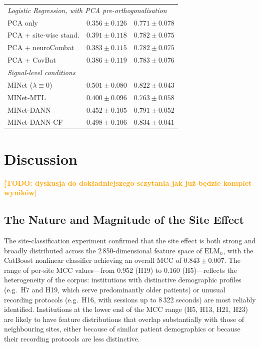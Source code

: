 \documentclass[preprint,12pt]{elsarticle}
\newcommand{\td}[1]{\textcolor{orange}{\textbf{[TODO: #1]}}}
\begin{document}
\begin{table}[htbp]
\begin{tabular}{lcc}
    \midrule
    \multicolumn{3}{l}{\textit{Logistic Regression, with PCA pre-orthogonalisation}} \\
    \quad PCA only
      & $0.356 \pm 0.126$ & $0.771 \pm 0.078$ \\
    \quad PCA + site-wise stand.
      & $0.391 \pm 0.118$ & $0.782 \pm 0.075$ \\
    \quad PCA + neuroCombat
      & $0.383 \pm 0.115$ & $0.782 \pm 0.075$ \\
    \quad PCA + CovBat
      & $0.386 \pm 0.119$ & $0.783 \pm 0.076$ \\
    \midrule
    \multicolumn{3}{l}{\textit{Signal-level conditions}} \\
    \quad MINet ($\lambda \equiv 0$)
      & $0.501 \pm 0.080$ & $0.822 \pm 0.043$ \\
    \quad MINet-MTL
      & $0.400 \pm 0.096$ & $0.763 \pm 0.058$ \\
    \quad MINet-DANN
      & $0.452 \pm 0.105$ & $0.791 \pm 0.052$ \\
    \quad MINet-DANN-CF
      & $0.498 \pm 0.106$ & $0.834 \pm 0.041$ \\
    \bottomrule
  \end{tabular}
\end{table}





\section{Discussion}
\label{sec:discussion}
\td{dyskusja do dokładniejszego sczytania jak już będzie komplet wyników}
\subsection{The Nature and Magnitude of the Site Effect}
\label{subsec:disc_site_effect}

The site-classification experiment confirmed that the site effect is
both strong and broadly distributed across the 2\,850-dimensional
feature space of $\mathrm{ELM}_n$, with the CatBoost nonlinear
classifier achieving an overall MCC of $0.843 \pm 0.007$.
The range of per-site MCC values---from 0.952 (H19) to 0.160
(H5)---reflects the heterogeneity of the corpus: institutions with
distinctive demographic profiles (e.g.\ H7 and H19, which serve
predominantly older patients) or unusual recording protocols
(e.g.\ H16, with sessions up to 8\,322 seconds) are most reliably
identified.
Institutions at the lower end of the MCC range (H5, H13, H21, H23)
are likely to have feature distributions that overlap substantially
with those of neighbouring sites, either because of similar patient
demographics or because their recording protocols are less
distinctive.
\end{document}
